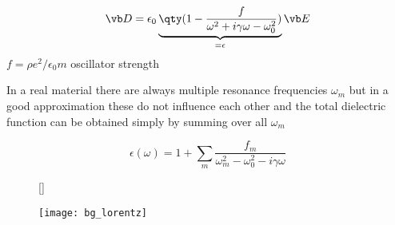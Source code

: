 \begin{equation}
    \vb D = 
    \epsilon_0 \underbrace{ 
    \qty(1 - \frac{f}{\omega^2 + i \gamma \omega - \omega_0^2})
    }_{
        =\epsilon
    }
    \vb E
\end{equation}
\indent
$f = \rho e^2 / \epsilon_0 m$ oscillator strength

In a real material there are always multiple resonance frequencies $\omega_m$ but in a good approximation these do not influence each other and the total dielectric function can be obtained simply by summing over all $\omega_m$

\begin{equation}
    \epsilon(\omega) = 
    1 + \sum_m \frac{f_m}{\omega_m^2 - \omega_0^2 - i \gamma \omega}
\end{equation}

\begin{figure}[H]
    [\FBwidth]
    {\caption{
        }
    \label{fig:al:same_spec}}
    {\texttt{[image: bg\_lorentz]}}
\end{figure}